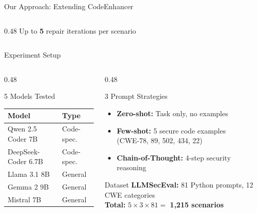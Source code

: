 \documentclass[aspectratio=169]{beamer}
\begin{document}
\begin{frame}{Our Approach: Extending CodeEnhancer}
\begin{columns}[T]
\begin{column}{0.48\textwidth}
      \small Up to \textbf{5} repair iterations per scenario
    \end{column}
  \end{columns}
\end{frame}

\begin{frame}{Experiment Setup}
  \begin{columns}[T]
    \begin{column}{0.48\textwidth}
      \begin{block}{5 Models Tested}
        \begin{tabular}{ll}
          \toprule
          \textbf{Model} & \textbf{Type} \\
          \midrule
          Qwen 2.5 Coder 7B   & Code-spec. \\
          DeepSeek-Coder 6.7B & Code-spec. \\
          Llama 3.1 8B        & General \\
          Gemma 2 9B          & General \\
          Mistral 7B          & General \\
          \bottomrule
        \end{tabular}
      \end{block}
    \end{column}
    \begin{column}{0.48\textwidth}
      \begin{block}{3 Prompt Strategies}
        \begin{itemize}
          \item \textbf{Zero-shot:} Task only, no examples
          \item \textbf{Few-shot:} 5 secure code examples\\(CWE-78, 89, 502, 434, 22)
          \item \textbf{Chain-of-Thought:} 4-step security reasoning
        \end{itemize}
      \end{block}
      \vspace{0.3em}
      \begin{block}{Dataset}
        \textbf{LLMSecEval:} 81 Python prompts, 12 CWE categories \\[0.3em]
        \textbf{Total:} $5 \times 3 \times 81 =$ \textbf{1,215 scenarios}
      \end{block}
    \end{column}
  \end{columns}
\end{frame}
\end{document}

